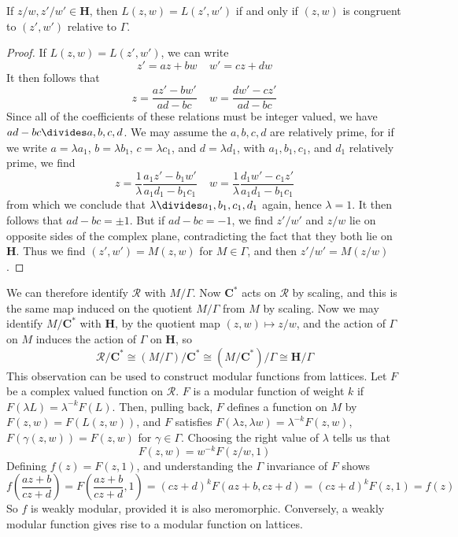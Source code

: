 \begin{theorem}
    If $z/w, z'/w' \in \mathbf{H}$, then $L(z,w) = L(z',w')$ if and only if $(z,w)$ is congruent to $(z',w')$ relative to $\Gamma$.
\end{theorem}
\begin{proof}
    If $L(z,w) = L(z',w')$, we can write
    \[ z' = az + bw\ \ \ \ \ w' = cz + dw \]
    It then follows that
    \[ z = \frac{az' - bw'}{ad - bc}\ \ \ \ \ w = \frac{dw' - cz'}{ad-bc} \]
    Since all of the coefficients of these relations must be integer valued, we have $ad - bc \divides a,b,c,d$. We may assume the $a,b,c,d$ are relatively prime, for if we write $a = \lambda a_1$, $b = \lambda b_1$, $c = \lambda c_1$, and $d = \lambda d_1$, with $a_1, b_1, c_1$, and $d_1$ relatively prime, we find
    \[ z = \frac{1}{\lambda} \frac{a_1 z' - b_1 w'}{a_1 d_1 - b_1 c_1} \ \ \ \ \ w =  \frac{1}{\lambda} \frac{d_1 w' - c_1 z'}{a_1 d_1 - b_1 c_1} \]
    from which we conclude that $\lambda \divides a_1, b_1, c_1, d_1$ again, hence $\lambda = 1$. It then follows that $ad - bc = \pm 1$. But if $ad - bc = -1$, we find $z'/w'$ and $z/w$ lie on opposite sides of the complex plane, contradicting the fact that they both lie on $\mathbf{H}$. Thus we find $(z',w') = M(z,w)$ for $M \in \Gamma$, and then $z'/w' = M(z/w)$.
\end{proof}

We can therefore identify $\mathcal{R}$ with $M/\Gamma$. Now $\mathbf{C}^*$ acts on $\mathcal{R}$ by scaling, and this is the same map induced on the quotient $M/\Gamma$ from $M$ by scaling. Now we may identify $M/\mathbf{C}^*$ with $\mathbf{H}$, by the quotient map $(z,w) \mapsto z/w$, and the action of $\Gamma$ on $M$ induces the action of $\Gamma$ on $\mathbf{H}$, so
%
\[ \mathcal{R}/\mathbf{C}^* \cong (M/\Gamma)/\mathbf{C}^* \cong (M/\mathbf{C}^*)/\Gamma \cong \mathbf{H}/\Gamma \]
%
This observation can be used to construct modular functions from lattices. Let $F$ be a complex valued function on $\mathcal{R}$. $F$ is a modular function of weight $k$ if $F(\lambda L) = \lambda^{-k} F(L)$. Then, pulling back, $F$ defines a function on $M$ by $F(z,w) = F(L(z,w))$, and $F$ satisfies $F(\lambda z, \lambda w) = \lambda^{-k} F(z,w)$, $F(\gamma (z,w)) = F(z,w)$ for $\gamma \in \Gamma$. Choosing the right value of $\lambda$ tells us that
%
\[ F(z,w) = w^{-k} F(z/w, 1) \]
%
Defining $f(z) = F(z,1)$, and understanding the $\Gamma$ invariance of $F$ shows
%
\[ f \left( \frac{az + b}{cz + d} \right) = F \left( \frac{az + b}{cz + d}, 1 \right) = (cz + d)^k F(az + b, cz + d) = (cz + d)^k F(z,1) = f(z) \]
%
So $f$ is weakly modular, provided it is also meromorphic. Conversely, a weakly modular function gives rise to a modular function on lattices.

